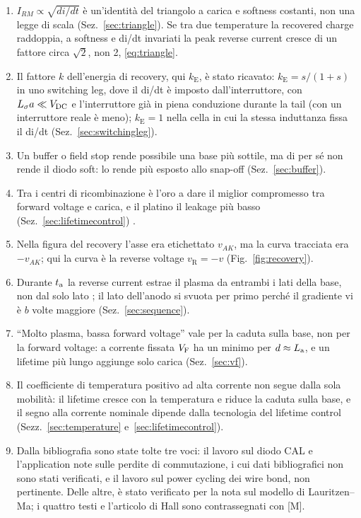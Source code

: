 \documentclass[10pt,a4paper]{scrartcl}
\let\newcommand\pdvaluedefine
\newcommand{\VF}{V_\mathrm{F}}
\newcommand{\ta}{t_\mathrm{a}}
\newcommand{\Ls}{L_\sigma}                    %
\newcommand{\La}{L_\mathrm{a}}
\newcommand{\Vdc}{V_\mathrm{DC}}
\newcommand{\Pp}{p\textsuperscript{+}}
\begin{document}
\begin{enumerate}
\item $I_{RM} \propto \sqrt{di/dt}$ è un'identità del triangolo a carica e softness costanti, non una legge di scala (Sez.~\ref{sec:triangle}). Se tra due temperature la recovered charge raddoppia, a softness e di/dt invariati la peak reverse current cresce di un fattore circa $\sqrt{2}$, non 2, \eqref{eq:triangle}.
\item Il fattore $k$ dell'energia di recovery, qui $k_\mathrm{E}$, è stato ricavato: $k_\mathrm{E} = s/(1+s)$ in uno switching leg, dove il di/dt è imposto dall'interruttore, con $\Ls a \ll \Vdc$ e l'interruttore già in piena conduzione durante la tail (con un interruttore reale è meno); $k_\mathrm{E} = 1$ nella cella in cui la stessa induttanza fissa il di/dt (Sez.~\ref{sec:switchingleg}).
\item Un buffer o field stop rende possibile una base più sottile, ma di per sé non rende il diodo soft: lo rende più esposto allo snap-off (Sez.~\ref{sec:buffer}).
\item Tra i centri di ricombinazione è l'oro a dare il miglior compromesso tra forward voltage e carica, e il platino il leakage più basso (Sez.~\ref{sec:lifetimecontrol}) \cite{baligasun1977}.
\item Nella figura del recovery l'asse era etichettato $v_{AK}$, ma la curva tracciata era $-v_{AK}$; qui la curva è la reverse voltage $v_\mathrm{R} = -v$ (Fig.~\ref{fig:recovery}).
\item Durante $\ta$ la reverse current estrae il plasma da entrambi i lati della base, non dal solo lato \Pp; il lato dell'anodo si svuota per primo perché il gradiente vi è $b$ volte maggiore (Sez.~\ref{sec:sequence}).
\item ``Molto plasma, bassa forward voltage'' vale per la caduta sulla base, non per la forward voltage: a corrente fissata $\VF$ ha un minimo per $d \approx \La$, e un lifetime più lungo aggiunge solo carica (Sez.~\ref{sec:vf}).
\item Il coefficiente di temperatura positivo ad alta corrente non segue dalla sola mobilità: il lifetime cresce con la temperatura e riduce la caduta sulla base, e il segno alla corrente nominale dipende dalla tecnologia del lifetime control (Sezz.~\ref{sec:temperature} e~\ref{sec:lifetimecontrol}).
\item Dalla bibliografia sono state tolte tre voci: il lavoro sul diodo CAL e l'application note sulle perdite di commutazione, i cui dati bibliografici non sono stati verificati, e il lavoro sul power cycling dei wire bond, non pertinente. Delle altre, \cite{lauritzen1991} è stato verificato per la nota sul modello di Lauritzen--Ma; i quattro testi e l'articolo di Hall sono contrassegnati con [M].
\end{enumerate}
\end{document}
